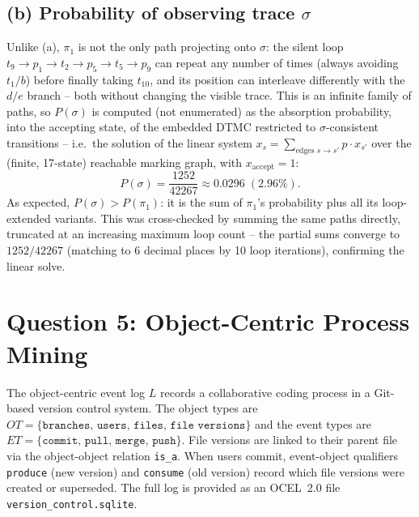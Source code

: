 \documentclass[11pt,a4paper]{article}
\newcommand{\otBranches}{\texttt{branches}}
\newcommand{\otUsers}{\texttt{users}}
\newcommand{\otFiles}{\texttt{files}}
\newcommand{\otFileVersions}{\texttt{file versions}}
\newcommand{\etCommit}{\texttt{commit}}
\newcommand{\etPull}{\texttt{pull}}
\newcommand{\etMerge}{\texttt{merge}}
\newcommand{\etPush}{\texttt{push}}
\newcommand{\logL}{$L$}
\begin{document}
\subsection*{(b) Probability of observing trace $\sigma$}
\label{sec:q3b}

Unlike (a), $\pi_1$ is not the only path projecting onto $\sigma$: the silent loop
$t_9 \to p_1 \to t_2 \to p_5 \to t_5 \to p_9$ can repeat any number of times (always avoiding
$t_1/b$) before finally taking $t_{10}$, and its position can interleave differently with the
$d/e$ branch -- both without changing the visible trace. This is an infinite family of paths, so
$P(\sigma)$ is computed (not enumerated) as the absorption probability, into the accepting
state, of the embedded DTMC restricted to $\sigma$-consistent transitions -- i.e.\ the solution
of the linear system $x_s = \sum_{\text{edges } s\to s'} p\cdot x_{s'}$ over the (finite, 17-state)
reachable marking graph, with $x_{\text{accept}}=1$:
\[
      P(\sigma) = \frac{1252}{42267} \approx 0.0296 \;(2.96\%).
\]
As expected, $P(\sigma) > P(\pi_1)$: it is the sum of $\pi_1$'s probability plus all its
loop-extended variants. This was cross-checked by summing the same paths directly, truncated at
an increasing maximum loop count -- the partial sums converge to $1252/42267$ (matching to 6
decimal places by 10 loop iterations), confirming the linear solve.


\section{Question 5: Object-Centric Process Mining}

The object-centric event log \logL{} records a collaborative coding process in a
Git-based version control system.
The object types are
$OT = \{\otBranches{},\, \otUsers{},\, \otFiles{},\, \otFileVersions{}\}$
and the event types are
$ET = \{\etCommit{},\, \etPull{},\, \etMerge{},\, \etPush{}\}$.
File versions are linked to their parent file via the object-object relation
\texttt{is\_a}.
When users commit, event-object qualifiers \texttt{produce} (new version) and
\texttt{consume} (old version) record which file versions were created or
superseded.
The full log is provided as an OCEL~2.0 file \texttt{version\_control.sqlite}.
\end{document}
